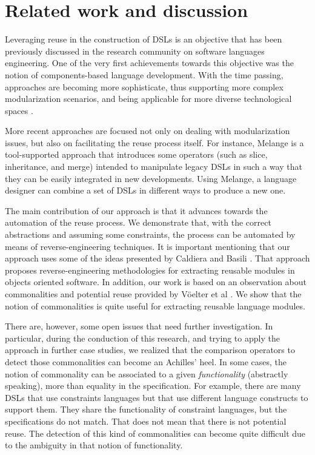 \section{Related work and discussion}
\label{sec:relatedwork}

Leveraging reuse in the construction of DSLs is an objective that has been previously discussed in the research community on software languages engineering. One of the very first achievements towards this objective was the notion of components-based language development. With the time passing, approaches are becoming more sophisticate, thus supporting more complex modularization scenarios, and being applicable for more diverse technological spaces \cite{Mernik:2013,Rumpe:2010,Voelter:2013b}. 

More recent approaches are focused not only on dealing with modularization issues, but also on facilitating the reuse process itself. For instance, Melange \cite{Degueule:2015} is a tool-supported approach that introduces some operators (such as slice, inheritance, and merge) intended to manipulate legacy DSLs in such a way that they can be easily integrated in new developments. Using Melange, a language designer can combine a set of DSLs in different ways to produce a new one.

The main contribution of our approach is that it advances towards the automation of the reuse process. We demonstrate that, with the correct abstractions and assuming some constraints, the process can be automated by means of reverse-engineering techniques. It is important mentioning that our approach uses some of the ideas presented by Caldiera and Basili \cite{Caldiera:1991}. That approach proposes reverse-engineering methodologies for extracting reusable modules in objects oriented software. In addition, our work is based on an observation about commonalities and potential reuse provided by V\"oelter et al \cite[p. 60-61]{voelter:2013}. We show that the notion of commonalities is quite useful for extracting reusable language modules.

There are, however, some open issues that need further investigation. In particular, during the conduction of this research, and trying to apply the approach in further case studies, we realized that the comparison operators to detect those commonalities can become an Achilles' heel. In some cases, the notion of commonality can be associated to a given \textit{functionality} (abstractly speaking), more than equality in the specification. For example, there are many DSLs that use constraints languages but that use different language constructs to support them. They share the functionality of constraint languages, but the specifications do not match. That does not mean that there is not potential reuse. The detection of this kind of commonalities can become quite difficult due to the ambiguity in that notion of functionality.

